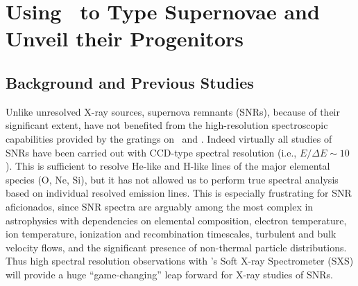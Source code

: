 \documentclass[11pt,a4paper]{article}
\begin{document}
\maketitle
\clearpage

\tableofcontents
\clearpage

\section{Using \ah\ to Type Supernovae and Unveil their Progenitors}

\subsection{Background and Previous Studies}

Unlike unresolved X-ray sources, supernova remnants (SNRs), because of
their significant extent, have not benefited from the high-resolution
spectroscopic capabilities provided by the gratings on \xmm\ and
\chandra.  Indeed virtually all studies of SNRs have been carried out
with CCD-type spectral resolution (i.e., $E/\Delta E \sim 10$).  This
is sufficient to resolve He-like and H-like lines of the major
elemental species (O, Ne, Si), but it has not allowed us to perform
true spectral analysis based on individual resolved emission lines.
This is especially frustrating for SNR aficionados, since SNR spectra
are arguably among the most complex in astrophysics with dependencies
on elemental composition, electron temperature, ion temperature,
ionization and recombination timescales, turbulent and bulk velocity
flows, and the significant presence of non-thermal particle
distributions.  Thus high spectral resolution observations with \ah's Soft X-ray Spectrometer (SXS)
will provide a huge ``game-changing'' leap forward for X-ray studies of
SNRs.
\end{document}
